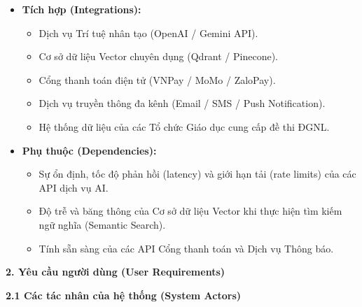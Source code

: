 \documentclass[a4paper,12pt]{article}
\begin{document}
\begin{itemize}
		\item \textbf{Tích hợp (Integrations):}
		\begin{itemize}
			\item Dịch vụ Trí tuệ nhân tạo (OpenAI / Gemini API).
			\item Cơ sở dữ liệu Vector chuyên dụng (Qdrant / Pinecone).
			\item Cổng thanh toán điện tử (VNPay / MoMo / ZaloPay).
			\item Dịch vụ truyền thông đa kênh (Email / SMS / Push Notification).
			\item Hệ thống dữ liệu của các Tổ chức Giáo dục cung cấp đề thi ĐGNL.
		\end{itemize}
		
		\item \textbf{Phụ thuộc (Dependencies):}
		\begin{itemize}
			\item Sự ổn định, tốc độ phản hồi (latency) và giới hạn tải (rate limits) của các API dịch vụ AI.
			\item Độ trễ và băng thông của Cơ sở dữ liệu Vector khi thực hiện tìm kiếm ngữ nghĩa (Semantic Search).
			\item Tính sẵn sàng của các API Cổng thanh toán và Dịch vụ Thông báo.
		\end{itemize}
	\end{itemize}
	
	\newpage
	
	{\Large \textbf{2. Yêu cầu người dùng (User Requirements)}}
	
	\vspace{0.3cm}
	
	{\large \textbf{2.1 Các tác nhân của hệ thống (System Actors)}}
	
	\vspace{0.3cm}
	
\end{document}
